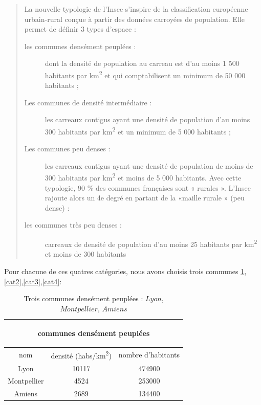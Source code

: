 \documentclass{book}
\begin{document}
\begin{quotation}
\begin{itshape}
La nouvelle typologie de l’Insee s’inspire de la classification européenne urbain-rural conçue à partir des données carroyées de population. 
Elle permet de définir 3 types d’espace :\\

\begin{description}
\item[les communes densément peuplées :] dont la densité de population au carreau est d’au moins 1 500 habitants par km\textsuperscript{2} 
et qui comptabilisent un minimum de 50 000 habitants ;

\item[Les communes de densité intermédiaire :] les carreaux contigus ayant une densité de population d’au moins 300 habitants par km\textsuperscript{2} 
et un minimum de 5 000 habitants ;

\item[Les communes peu denses :] les carreaux contigus ayant une densité de population de moins de 300 habitants par km\textsuperscript{2} 
et moins de 5 000 habitants.
Avec cette typologie, 90 \% des communes françaises sont « rurales ». L’Insee rajoute alors un 4e degré en partant de la «maille rurale » (peu dense) :

\item[les communes très peu denses :] carreaux de densité de population d’au moins 25 habitants par km\textsuperscript{2} et moins de 300 habitants
\end{description}
\end{itshape}
\end{quotation}

Pour chacune de ces quatres catégories, nous avons choisis trois communes \ref{cat1},\ref{cat2},\ref{cat3},\ref{cat4}:\\

\clearpage

\begin{table}
\begin{center}
\begin{adjustbox}{max width=\textwidth}
\begin{tabular}{|c|c|c|}
\hline
\multicolumn{3}{c|}{\begin{bf}communes densément peuplées\end{bf}} \\
\hline 
nom & densité (habs/km\textsuperscript{2}) & nombre d'habitants \\
\hline 
Lyon & 10117 & 474900\\
\hline 
Montpellier & 4524 & 253000 \\
\hline 
Amiens & 2689 & 134400 \\
\hline
\end{tabular}
\end{adjustbox}
\end{center}
\caption{Trois communes densément peuplées : $Lyon$, $Montpellier$, $Amiens$}
\label{cat1}
\end{table}
\end{document}
